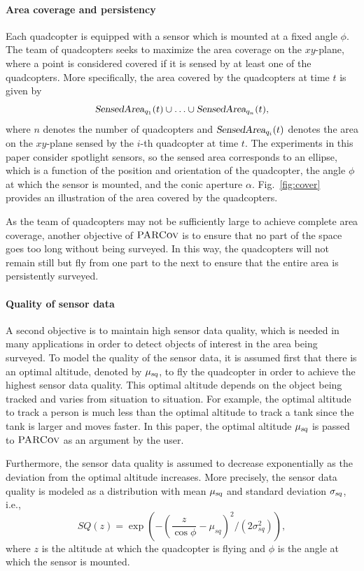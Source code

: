\documentclass[letterpaper, 10pt, conference]{ieeeconf}
\newcommand{\Function}[1]{\ensuremath{{ \textsc{#1}}}}
\newcommand{\Var}[1]{\ensuremath{{{\textsl{#1}}}}}
\newcommand{\Name}{\Function{\small{PARCov}}}
\begin{document}
\paragraph{Area coverage and persistency}
\label{sec:Coverage}  Each quadcopter is
equipped with a sensor which is mounted at a fixed angle $\phi$.  The
team of quadcopters seeks to maximize the area coverage on the
$xy$-plane, where a point is considered covered if it is sensed by at
least one of the quadcopters. More specifically, 
the area covered by the quadcopters at time $t$ is given by
$$
\Var{SensedArea}_{q_1}(t) \cup \ldots \cup \Var{SensedArea}_{q_n}(t),
$$ where $n$ denotes the number of quadcopters and
$\Var{SensedArea}_{q_i}(t)$ denotes the area on the $xy$-plane sensed
by the $i$-th quadcopter at time $t$.  The experiments
in this paper consider spotlight sensors, so the sensed area
corresponds to an ellipse, which is a function of the 
position and orientation of the quadcopter, the angle $\phi$ at which
the sensor is mounted, and the conic aperture $\alpha$.
Fig.~\ref{fig:cover} provides an illustration of the area covered by
the quadcopters.

As the team of quadcopters may not be sufficiently large to achieve
complete area coverage, another objective of $\Name$ is
to ensure that no part of the space goes too long without being
surveyed. In this way, the quadcopters will not remain still but fly
from one part to the next to ensure that the entire area is
persistently surveyed.

\paragraph{Quality of sensor data}
\label{sec:SQ} A second objective is to maintain high sensor data quality, which is needed
in many applications in order to detect objects of interest in the
area being surveyed.  To model the quality of the sensor data, it is
assumed first that there is an optimal altitude, denoted by
$\mu_\Var{sq}$, to fly the quadcopter in order to achieve the highest
sensor data quality. This optimal altitude depends on the object being
tracked and varies from situation to situation. For example, the
optimal altitude to track a person is much less than the optimal altitude
to track a tank since the tank is larger and moves faster.  In this
paper, the optimal altitude $\mu_\Var{sq}$ is passed to $\Name$ as an
argument by the user.

Furthermore, the sensor data quality is assumed to decrease exponentially
as the deviation from the optimal altitude increases. More precisely,
the sensor data quality is modeled as a distribution with mean
$\mu_\Var{sq}$ and standard deviation $\sigma_\Var{sq}$, i.e.,
$$ SQ(z) = \exp{(-{(\frac{z}{ \cos{\phi}} -
\mu_{sq})^2}/{(2\sigma_{sq}^2)})},
$$
where $z$ is the altitude at which the quadcopter is flying and $\phi$
is the angle at which the sensor is mounted.
\end{document}
